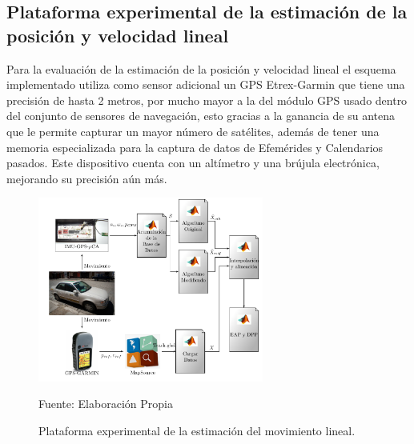 \documentclass[conference]{IEEEtran}
\begin{document}
\begin{enumerate}
\subsection{Plataforma experimental de la estimación de la posición y velocidad lineal}
Para la evaluación de la estimación de la posición y velocidad lineal el esquema implementado utiliza como sensor adicional un GPS Etrex-Garmin que tiene una precisión de hasta 2 metros, por mucho mayor a la del módulo GPS usado dentro del conjunto de sensores de navegación, esto gracias a la ganancia de su antena que le permite capturar un mayor número de satélites, además de tener una memoria especializada para la captura de datos de Efemérides y Calendarios pasados. Este dispositivo cuenta con un altímetro y una brújula electrónica, mejorando su precisión aún más.\par%
\begin{figure}
\centering
\includegraphics[width=20em]{plataforma_fig11.pdf}
\caption{Plataforma experimental de la estimación del movimiento lineal.}
\scriptsize{Fuente: Elaboración Propia}
\label{plataforma_fig9}
\end{figure}

\end{enumerate}
\end{document}
